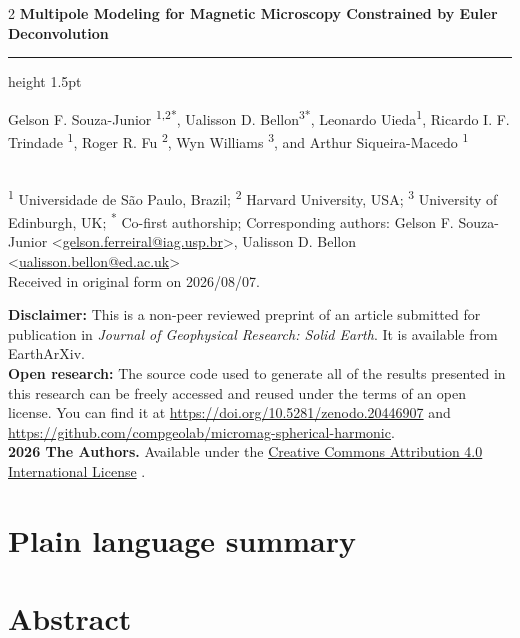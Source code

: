 \documentclass[onecolumn,10pt]{article}
\makeatletter
\newcommand{\Title}{Multipole Modeling for Magnetic Microscopy Constrained by Euler Deconvolution}
\newcommand{\Year}{2026}
\newcommand{\SubmittedOn}{2026/08/07}
\newcommand{\PublishedOn}{2026/08/07}
\newcommand{\AuthorShort}{Souza-Junior \textit{et al.}}
\newcommand{\Authors}{%
Gelson F. Souza-Junior \textsuperscript{1,2*},
Ualisson D. Bellon\textsuperscript{3*},
Leonardo Uieda\textsuperscript{1},
Ricardo I. F. Trindade \textsuperscript{1},
Roger R. Fu \textsuperscript{2},
Wyn Williams \textsuperscript{3}, and
Arthur Siqueira-Macedo \textsuperscript{1}
}
\newcommand{\Emailgelson}{gelson.ferreiral@iag.usp.br}
\newcommand{\Emailualisson}{ualisson.bellon@ed.ac.uk}
\newcommand{\Corresponding}{%
  Corresponding authors: Gelson F. Souza-Junior <\href{mailto:\Email}{\Emailgelson}>,
  Ualisson D. Bellon <\href{mailto:\Email}{\Emailualisson}>
}
\newcommand{\Affiliations}{%
  \textsuperscript{1} Universidade de São Paulo, Brazil;
  \textsuperscript{2} Harvard University, USA;
  \textsuperscript{3} University of Edinburgh, UK;
  \textsuperscript{*} Co-first authorship;
}
\newcommand{\Journal}{Journal of Geophysical Research: Solid Earth}
\newcommand{\JournalDOI}{YYYYY/YYYYYYY}
\newcommand{\PreprintDOI}{XXXXX/XXXXXXX}
\newcommand{\ArchiveDOI}{10.5281/zenodo.20446907}
\newcommand{\GitHubRepository}{compgeolab/micromag-spherical-harmonic}
\newcommand{\Keywords}{%
  keyword1; keyword2; keyword3;
}
\makeatother
\begin{document}
\thispagestyle{plain}
\begin{FlushLeft}
  \begin{spacing}{2}
    {\LARGE\bfseries \Title}
  \end{spacing}
  {\color{lightgray}\hrule height 1.5pt}
  \vspace{0.3cm}
  \Authors
  \\[0.2cm]
  {\footnotesize \Affiliations}
  \newline
  {\footnotesize \Corresponding}
  \\[0.2cm]
  {\footnotesize
    Received in original form on \SubmittedOn.
  }
\end{FlushLeft}

\begin{summarybox}
  \noindent
  \textbf{Disclaimer:}
  This is a non-peer reviewed preprint of an article submitted for publication
  in \textit{\Journal{}}. It is available from EarthArXiv. %
  \\[0.25cm]
  \noindent
  \textbf{Open research:}
  The source code used to generate all of the results presented in this
  research can be freely accessed and reused under the terms of an open license.
  You can find it at \url{https://doi.org/\ArchiveDOI} and
  \url{https://github.com/\GitHubRepository}.
  \\[0.25cm]
  \noindent
  \textbf{\textcopyright{} \Year{} The Authors.}
  Available under the \href{https://creativecommons.org/licenses/by/4.0/}{Creative Commons Attribution 4.0 International License}
  \faCreativeCommons\faCreativeCommonsBy{}.
\end{summarybox}

\section*{\normalsize Plain language summary}
\begingroup
   \small  \par
\endgroup

\section*{\normalsize Abstract}
\begingroup
   \small  \par
\endgroup





\end{document}
